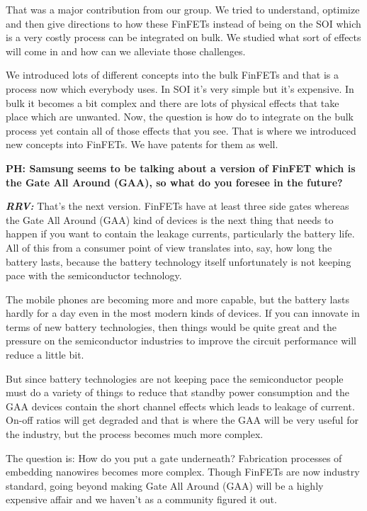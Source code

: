 \begin{multicols}{2}
That was a major contribution from our group. We tried to understand, optimize and then give directions to how these FinFETs instead of being on the SOI which is a very costly process can be integrated on bulk. We studied what sort of effects will come in and how can we alleviate those challenges.

We introduced lots of different concepts into the bulk FinFETs and that is a process now which everybody uses. In SOI it’s very simple but it’s expensive. In bulk it becomes a bit complex and there are lots of physical effects that take place which are unwanted. Now, the question is how do to integrate on the bulk process yet contain all of those effects that you see. That is where we introduced new concepts into FinFETs. We have patents for them as well.

\textbf{PH: Samsung seems to be talking about a version of FinFET which is the Gate All Around (GAA), so what do you foresee in the future?}

\textbf{\textit{RRV: }} That’s the next version. FinFETs have at least three side gates whereas the Gate All Around (GAA) kind of devices is the next thing that needs to happen if you want to contain the leakage currents, particularly the battery life. All of this from a consumer point of view translates into, say, how long the battery lasts, because the battery technology itself unfortunately is not keeping pace with the semiconductor technology.
 
 The mobile phones are becoming more and more capable, but the battery lasts hardly for a day even in the most modern kinds of devices. If you can innovate in terms of new battery technologies, then things would be quite great and the pressure on the semiconductor industries to improve the circuit performance will reduce a little bit.
 
 But since battery technologies are not keeping pace the semiconductor people must do a variety of things to reduce that standby power consumption and the GAA devices contain the short channel effects which leads to leakage of current. On-off ratios will get degraded and that is where the GAA will be very useful for the industry, but the process becomes much more complex.
 
 The question is: How do you put a gate underneath? Fabrication processes of embedding nanowires becomes more complex. Though FinFETs are now industry standard, going beyond making Gate All Around (GAA) will be a highly expensive affair and we haven’t as a community figured it out.
 

\end{multicols}
